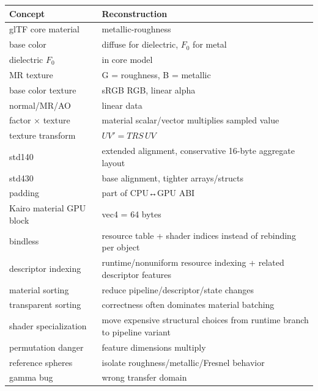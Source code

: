 {\def\LTcaptype{none} %
\begin{longtable}[]{@{}
  >{\raggedright\arraybackslash}p{}
  >{\raggedright\arraybackslash}p{}@{}}
\toprule\noalign{}
\begin{minipage}[b]{\linewidth}\raggedright
Concept
\end{minipage} & \begin{minipage}[b]{\linewidth}\raggedright
Reconstruction
\end{minipage} \\
\midrule\noalign{}
\endhead
\bottomrule\noalign{}
\endlastfoot
glTF core material & metallic-roughness \\
base color & diffuse for dielectric, \(F_0\) for metal \\
dielectric \(F_0\) & 0.04 in core model \\
MR texture & G = roughness, B = metallic \\
base color texture & sRGB RGB, linear alpha \\
normal/MR/AO & linear data \\
factor × texture & material scalar/vector multiplies sampled value \\
texture transform & \(UV'=TRS\,UV\) \\
std140 & extended alignment, conservative 16-byte aggregate layout \\
std430 & base alignment, tighter arrays/structs \\
padding & part of CPU↔GPU ABI \\
Kairo material GPU block & 4 vec4 = 64 bytes \\
bindless & resource table + shader indices instead of rebinding per object \\
descriptor indexing & runtime/nonuniform resource indexing + related descriptor features \\
material sorting & reduce pipeline/descriptor/state changes \\
transparent sorting & correctness often dominates material batching \\
shader specialization & move expensive structural choices from runtime branch to pipeline variant \\
permutation danger & feature dimensions multiply \\
reference spheres & isolate roughness/metallic/Fresnel behavior \\
gamma bug & wrong transfer domain \\

\end{longtable}}
